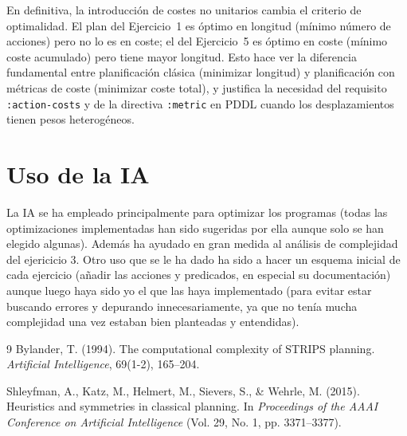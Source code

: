 \documentclass[10pt]{article}
\begin{document}
En definitiva, la introducción de costes no unitarios cambia el criterio de optimalidad. El plan del Ejercicio~1 es óptimo en longitud (mínimo número de acciones) pero no lo es en coste; el del Ejercicio~5 es óptimo en coste (mínimo coste acumulado) pero tiene mayor longitud. Esto hace ver la diferencia fundamental entre planificación clásica (minimizar longitud) y planificación con métricas de coste (minimizar coste total), y justifica la necesidad del requisito \texttt{:action-costs} y de la directiva \texttt{:metric} en PDDL cuando los desplazamientos tienen pesos heterogéneos.

\section*{Uso de la IA}
La IA se ha empleado principalmente para optimizar los programas (todas las optimizaciones implementadas han sido sugeridas por ella aunque solo se han elegido algunas). Además ha ayudado en gran medida al análisis de complejidad del ejericicio 3. Otro uso que se le ha dado ha sido a hacer un esquema inicial de cada ejercicio (añadir las acciones y predicados, en especial su documentación) aunque luego haya sido yo el que las haya implementado (para evitar estar buscando errores y depurando innecesariamente, ya que no tenía mucha complejidad una vez estaban bien planteadas y entendidas). 

\begin{thebibliography}{9}
Bylander, T. (1994). 
The computational complexity of STRIPS planning. 
\emph{Artificial Intelligence}, 69(1-2), 165--204.

Shleyfman, A., Katz, M., Helmert, M., Sievers, S., \& Wehrle, M. (2015). 
Heuristics and symmetries in classical planning. 
In \emph{Proceedings of the AAAI Conference on Artificial Intelligence} (Vol. 29, No. 1, pp. 3371--3377).
\end{thebibliography}
\end{document}
